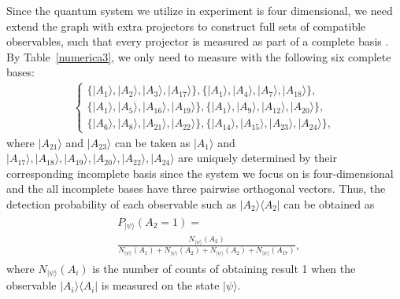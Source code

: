 \documentclass[prl,letterpaper,english,reprint,nofootinbib,aps,superscriptaddress,showpacs,showkeys]{revtex4-1}
\theoremstyle{definition}
\theoremstyle{remark}
\begin{document}
Since the quantum system we utilize in experiment is four dimensional, we need extend the graph with extra projectors to construct full sets of compatible observables, such that every projector is measured as part of a complete basis \cite{yxiao17}. By Table~\ref{numerica3}, we only need to measure with the following six complete bases:
\begin{eqnarray}
\left\{
  \begin{array}{ll}
    \{|A_1\rangle,|A_2\rangle,|A_3\rangle,|A_{17}\rangle\},  \{|A_1\rangle,|A_4\rangle,|A_7\rangle,|A_{18}\rangle\},\\
\{|A_1\rangle,|A_{5}\rangle,|A_{16}\rangle,|A_{19}\rangle\},
\{|A_1\rangle,|A_{9}\rangle,|A_{12}\rangle,|A_{20}\rangle\},\ \ \ \\
\{|A_{6}\rangle,|A_{8}\rangle,|A_{21}\rangle,|A_{22}\rangle\},
\{|A_{14}\rangle,|A_{15}\rangle,|A_{23}\rangle,|A_{24}\rangle\},
\end{array}
\right.
\end{eqnarray}
where $|A_{21}\rangle$ and $|A_{23}\rangle$ can be taken as $|A_{1}\rangle$ and $|A_{17}\rangle,|A_{18}\rangle,|A_{19}\rangle,|A_{20}\rangle,|A_{22}\rangle,|A_{24}\rangle$ are uniquely determined by their corresponding incomplete basis since the system we focus on is four-dimensional and the  all incomplete bases have three pairwise orthogonal vectors.
 Thus, the detection probability of each observable such as $|A_{2}\rangle\langle A_{2}|$ can be obtained as
\begin{eqnarray}
\begin{split}
&P_{|\psi\rangle}(A_2=1)=\\
&\frac{N_{|\psi\rangle}(A_2)}
{N_{|\psi\rangle}(A_1)+N_{|\psi\rangle}(A_2)+N_{|\psi\rangle}(A_2)+N_{|\psi\rangle}(A_{17})},
\end{split}
\end{eqnarray}
where $N_{|\psi\rangle}(A_i)$ is the number of counts of obtaining result 1 when the observable $|A_{i}\rangle\langle A_{i}|$ is measured on the state $|\psi\rangle.$
\end{document}
